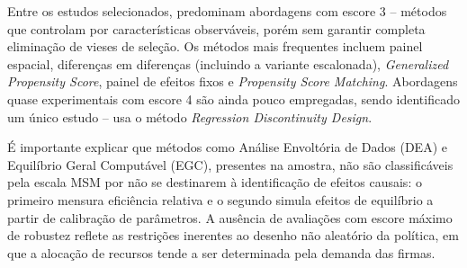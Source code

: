 Entre os estudos selecionados, predominam abordagens com escore 3 -- métodos que controlam por características observáveis, porém sem garantir completa eliminação de vieses de seleção. Os métodos mais frequentes incluem painel espacial, diferenças em diferenças (incluindo a variante escalonada), \textit{Generalized Propensity Score}, painel de efeitos fixos e \textit{Propensity Score Matching}. Abordagens quase experimentais com escore 4 são ainda pouco empregadas, sendo identificado um único estudo --  usa o método \textit{Regression Discontinuity Design}.

É importante explicar que métodos como Análise Envoltória de Dados (DEA) e Equilíbrio Geral Computável (EGC), presentes na amostra, não são classificáveis pela escala MSM por não se destinarem à identificação de efeitos causais: o primeiro mensura eficiência relativa e o segundo simula efeitos de equilíbrio a partir de calibração de parâmetros. A ausência de avaliações com escore máximo de robustez reflete as restrições inerentes ao desenho não aleatório da política, em que a alocação de recursos tende a ser determinada pela demanda das firmas.

